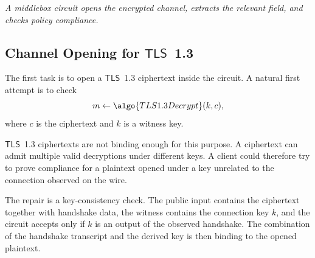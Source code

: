 \documentclass[11pt]{article}
\newcommand{\TLS}{\ensuremath{\mathsf{TLS}}}
\begin{document}
\begin{center}

\smallskip
\emph{A middlebox circuit opens the encrypted channel, extracts the relevant
field, and checks policy compliance.}
\end{center}

\subsection{Channel Opening for \texorpdfstring{\TLS~1.3}{TLS 1.3}}

The first task is to open a \TLS~1.3 ciphertext inside the circuit.  A natural
first attempt is to check
\[
  m \leftarrow \algo{TLS1.3Decrypt}(k, c),
\]
where $c$ is the ciphertext and $k$ is a witness key.

\begin{remark}
\TLS~1.3  ciphertexts are not binding enough for this purpose.
A ciphertext can admit multiple valid decryptions under different keys.  A
client could therefore try to prove compliance for a plaintext opened under a
key unrelated to the connection observed on the wire.
\end{remark}

The repair is a key-consistency check.  The public input contains the
ciphertext together with handshake data, the witness contains the connection
key $k$, and the circuit accepts only if $k$ is an output of the observed
handshake.  The combination of the handshake transcript and the derived key is
then binding to the opened plaintext.
\end{document}
